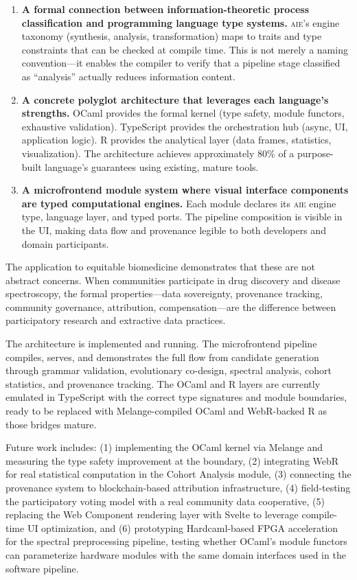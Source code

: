 \documentclass[11pt,letterpaper]{article}
\newcommand{\aie}{\textsc{aie}}
\begin{document}
\begin{enumerate}[leftmargin=*]
  \item \textbf{A formal connection between information-theoretic process classification and programming language type systems.} \aie{}'s engine taxonomy (synthesis, analysis, transformation) maps to traits and type constraints that can be checked at compile time. This is not merely a naming convention---it enables the compiler to verify that a pipeline stage classified as ``analysis'' actually reduces information content.

  \item \textbf{A concrete polyglot architecture that leverages each language's strengths.} OCaml provides the formal kernel (type safety, module functors, exhaustive validation). TypeScript provides the orchestration hub (async, UI, application logic). R provides the analytical layer (data frames, statistics, visualization). The architecture achieves approximately 80\% of a purpose-built language's guarantees using existing, mature tools.

  \item \textbf{A microfrontend module system where visual interface components are typed computational engines.} Each module declares its \aie{} engine type, language layer, and typed ports. The pipeline composition is visible in the UI, making data flow and provenance legible to both developers and domain participants.
\end{enumerate}

The application to equitable biomedicine demonstrates that these are not abstract concerns. When communities participate in drug discovery and disease spectroscopy, the formal properties---data sovereignty, provenance tracking, community governance, attribution, compensation---are the difference between participatory research and extractive data practices.

The architecture is implemented and running. The microfrontend pipeline compiles, serves, and demonstrates the full flow from candidate generation through grammar validation, evolutionary co-design, spectral analysis, cohort statistics, and provenance tracking. The OCaml and R layers are currently emulated in TypeScript with the correct type signatures and module boundaries, ready to be replaced with Melange-compiled OCaml and WebR-backed R as those bridges mature.

Future work includes: (1) implementing the OCaml kernel via Melange and measuring the type safety improvement at the boundary, (2) integrating WebR for real statistical computation in the Cohort Analysis module, (3) connecting the provenance system to blockchain-based attribution infrastructure, (4) field-testing the participatory voting model with a real community data cooperative, (5) replacing the Web Component rendering layer with Svelte to leverage compile-time UI optimization, and (6) prototyping Hardcaml-based FPGA acceleration for the spectral preprocessing pipeline, testing whether OCaml's module functors can parameterize hardware modules with the same domain interfaces used in the software pipeline.
\end{document}
